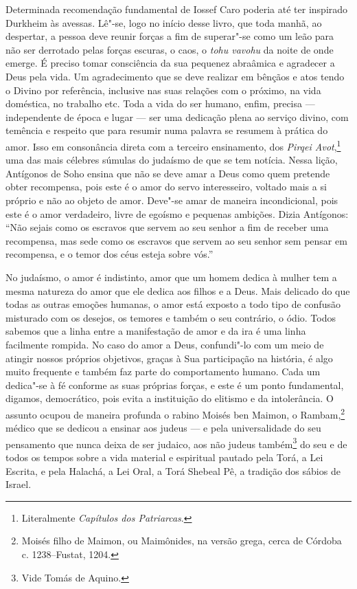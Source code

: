 Determinada recomendação fundamental de Iossef Caro poderia até ter
inspirado Durkheim às avessas. Lê"-se, logo no início desse livro, que
toda manhã, ao despertar, a pessoa deve reunir forças a fim de superar"-se
como um leão para não ser derrotado pelas forças escuras, o caos, o
\emph{tohu vavohu} da noite de onde emerge. É preciso tomar consciência
da sua pequenez abraâmica e agradecer a Deus pela vida. Um agradecimento
que se deve realizar em bênçãos e atos tendo o Divino por referência,
inclusive nas suas relações com o próximo, na vida doméstica, no
trabalho etc. Toda a vida do ser humano, enfim, precisa --- independente
de época e lugar --- ser uma dedicação plena ao serviço divino, com
temência e respeito que para resumir numa palavra se resumem à prática
do amor. Isso em consonância direta com a terceiro ensinamento, dos
\emph{Pirqei Avot},\footnote{Literalmente \emph{Capítulos dos Patriarcas}.} uma das mais célebres
súmulas do judaísmo de que se tem notícia. Nessa lição, Antígonos de
Soho ensina que não se deve amar a Deus como quem pretende obter
recompensa, pois este é o amor do servo interesseiro, voltado mais a si
próprio e não ao objeto de amor. Deve"-se amar de maneira incondicional,
pois este é o amor verdadeiro, livre de egoísmo e pequenas ambições.
Dizia Antígonos: ``Não sejais como os escravos que servem ao seu senhor
a fim de receber uma recompensa, mas sede como os escravos que servem ao
seu senhor sem pensar em recompensa, e o temor dos céus esteja sobre
vós.''

\asterisc

No judaísmo, o amor é indistinto, amor que um homem dedica à mulher tem
a mesma natureza do amor que ele dedica aos filhos e a Deus. Mais
delicado do que todas as outras emoções humanas, o amor está exposto a
todo tipo de confusão misturado com os desejos, os temores e também o
seu contrário, o ódio. Todos sabemos que a linha entre a manifestação de
amor e da ira é uma linha facilmente rompida. No caso do amor a Deus,
confundi"-lo com um meio de atingir nossos próprios objetivos, graças à
Sua participação na história, é algo muito frequente e também faz parte
do comportamento humano. Cada um dedica"-se à fé conforme as suas
próprias forças, e este é um ponto fundamental, digamos, democrático,
pois evita a instituição do elitismo e da intolerância. O assunto ocupou
de maneira profunda o rabino Moisés ben Maimon, o Rambam,\footnote{Moisés filho de Maimon, ou Maimônides, na versão grega, cerca de Córdoba c. 1238--Fustat, 1204.} médico que se dedicou a ensinar aos judeus
--- e pela universalidade do seu pensamento que nunca deixa de ser
judaico, aos não judeus também\footnote{Vide Tomás de Aquino.} do seu e de todos
os tempos sobre a vida material e espiritual pautado pela Torá, a Lei
Escrita, e pela Halachá, a Lei Oral, a Torá Shebeal Pê, a tradição dos
sábios de Israel.

